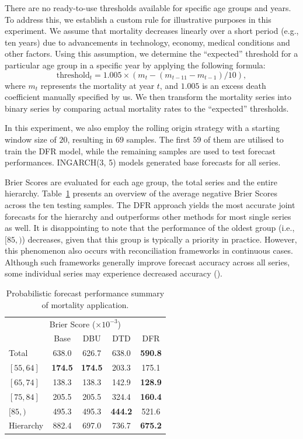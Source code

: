 \documentclass[a4paper,review,12pt,authoryear]{elsarticle}
\begin{document}
     There are no ready-to-use thresholds available for specific age groups and years. 
     To address this, we establish a custom rule for illustrative purposes in this experiment. 
     We assume that mortality decreases linearly over a short period (e.g., ten years) due to advancements in technology, economy, medical conditions and other factors. 
     Using this assumption, we determine the ``expected'' threshold for a particular age group in a specific year by applying the following formula:
     \[
       \text{threshold}_t = 1.005 \times (m_t - (m_{t-11} - m_{t-1})/10),
     \]
     where $m_t$ represents the mortality at year $t$, and $1.005$ is an excess death coefficient manually specified by us.
     We then transform the mortality series into binary series by comparing actual mortality rates to the ``expected'' thresholds.
     
     In this experiment, we also employ the rolling origin strategy with a starting window size of $20$, resulting in $69$ samples.
     The first $59$ of them are utilised to train the DFR model, while the remaining samples are used to test forecast performances.
     INGARCH(3, 5) models generated base forecasts for all series. 
     
     Brier Scores are evaluated for each age group, the total series and the entire hierarchy.
     Table~\ref{tab:mortality_age} presents an overview of the average negative Brier Scores across the ten testing samples.
     The DFR approach yields the most accurate joint forecasts for the hierarchy and outperforms other methods for most single series as well.
     It is disappointing to note that the performance of the oldest group (i.e., $[85, )$) decreases, given that this group is typically a priority in practice.
     However, this phenomenon also occurs with reconciliation frameworks in continuous cases. 
     Although such frameworks generally improve forecast accuracy across all series, some individual series may experience decreased accuracy (\citealp{zhangOptimalReconciliationImmutable2022a}).
     
     
     \begin{table}
       \centering
       \caption{\label{tab:mortality_age} Probabilistic forecast performance summary of mortality application.}
       \begin{tabular}{lcccc}
       \toprule
       \multicolumn{5}{c}{Brier Score ($\times 10^{-3}$)}\\ 
       & Base & DBU & DTD & DFR \\\midrule
       Total & 638.0 & 626.7 & 638.0 & \textbf{590.8} \\
       $[55, 64]$ & \textbf{174.5} & \textbf{174.5} & 203.3 & 175.1 \\
       $[65, 74]$ & 138.3 & 138.3 & 142.9 & \textbf{128.9}\\
       $[75, 84]$ & 205.5 & 205.5 & 324.4 & \textbf{160.4}\\
       $[85, )$ & 495.3 & 495.3 & \textbf{444.2} & 521.6\\
       Hierarchy & 882.4 & 697.0 & 736.7 & \textbf{675.2} \\
       \bottomrule
      \end{tabular}
     \end{table}
\end{document}
